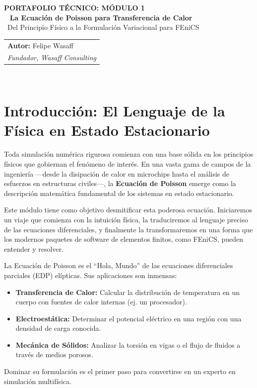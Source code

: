 \documentclass[11pt, a4paper]{article}
\begin{document}
\sffamily
{\color{WasaffCopper} \large \textbf{PORTAFOLIO TÉCNICO: MÓDULO 1}}\\
\
{\color{WasaffNavy} \huge \textbf{La Ecuación de Poisson para Transferencia de Calor}}\\
\
{\Large Del Principio Físico a la Formulación Variacional para FEniCS}\\
\vspace{1cm}
\rmfamily
\begin{tabular}{@{}p{14cm}}
    \textbf{Autor:} Felipe Wasaff \\
    \textit{Fundador, Wasaff Consulting} \\
\end{tabular}
\
\hrulefill
\
\tableofcontents
\
\hrulefill
\
\newpage


\section{Introducción: El Lenguaje de la Física en Estado Estacionario}
Toda simulación numérica rigurosa comienza con una base sólida en los principios físicos que gobiernan el fenómeno de interés. En una vasta gama de campos de la ingeniería —desde la disipación de calor en microchips hasta el análisis de esfuerzos en estructuras civiles—, la \textbf{Ecuación de Poisson} emerge como la descripción matemática fundamental de los sistemas en estado estacionario.

Este módulo tiene como objetivo desmitificar esta poderosa ecuación. Iniciaremos un viaje que comienza con la intuición física, la traduciremos al lenguaje preciso de las ecuaciones diferenciales, y finalmente la transformaremos en una forma que los modernos paquetes de software de elementos finitos, como FEniCS, pueden entender y resolver.

\begin{infobox}
    La Ecuación de Poisson es el ``Hola, Mundo'' de las ecuaciones diferenciales parciales (EDP) elípticas. Sus aplicaciones son inmensas:
    \begin{itemize}
        \item \textbf{Transferencia de Calor:} Calcular la distribución de temperatura en un cuerpo con fuentes de calor internas (ej. un procesador).
        \item \textbf{Electroestática:} Determinar el potencial eléctrico en una región con una densidad de carga conocida.
        \item \textbf{Mecánica de Sólidos:} Analizar la torsión en vigas o el flujo de fluidos a través de medios porosos.
    \end{itemize}
    Dominar su formulación es el primer paso para convertirse en un experto en simulación multifísica.
\end{infobox}
\end{document}
